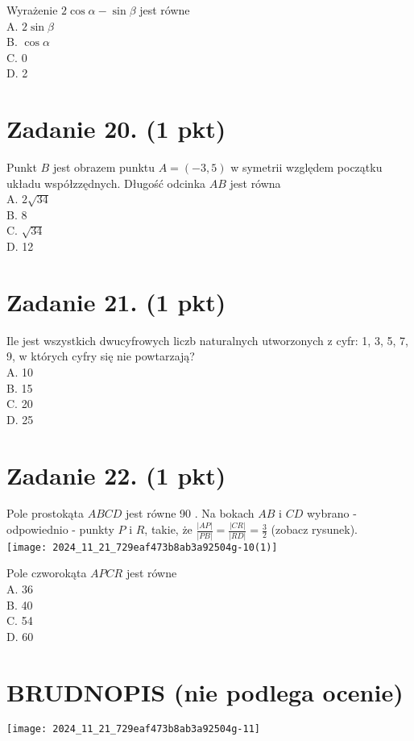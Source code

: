 \documentclass[10pt]{article}
\begin{document}
Wyrażenie \(2 \cos \alpha-\sin \beta\) jest równe\\
A. \(2 \sin \beta\)\\
B. \(\cos \alpha\)\\
C. 0\\
D. 2

\section*{Zadanie 20. (1 pkt)}
Punkt \(B\) jest obrazem punktu \(A=(-3,5)\) w symetrii względem początku układu współzzędnych. Długość odcinka \(A B\) jest równa\\
A. \(2 \sqrt{34}\)\\
B. 8\\
C. \(\sqrt{34}\)\\
D. 12

\section*{Zadanie 21. (1 pkt)}
Ile jest wszystkich dwucyfrowych liczb naturalnych utworzonych z cyfr: 1, 3, 5, 7, 9, w których cyfry się nie powtarzają?\\
A. 10\\
B. 15\\
C. 20\\
D. 25

\section*{Zadanie 22. (1 pkt)}
Pole prostokąta \(A B C D\) jest równe 90 . Na bokach \(A B\) i \(C D\) wybrano - odpowiednio - punkty \(P\) i \(R\), takie, że \(\frac{|A P|}{|P B|}=\frac{|C R|}{|R D|}=\frac{3}{2}\) (zobacz rysunek).\\
\texttt{[image: 2024\_11\_21\_729eaf473b8ab3a92504g-10(1)]}

Pole czworokąta \(A P C R\) jest równe\\
A. 36\\
B. 40\\
C. 54\\
D. 60

\section*{BRUDNOPIS (nie podlega ocenie)}
\begin{center}
\texttt{[image: 2024\_11\_21\_729eaf473b8ab3a92504g-11]}
\end{center}
\end{document}
